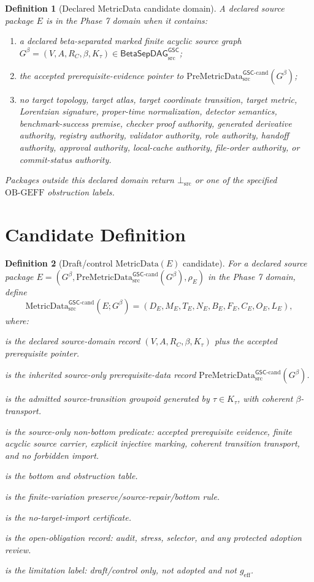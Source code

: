 \documentclass[11pt]{article}
\newcommand{\PreMetricData}{\mathrm{PreMetricData}_{\mathrm{src}}^{\mathsf{GSC}\mbox{-}\mathrm{cand}}}
\newcommand{\MetricData}{\mathrm{MetricData}_{\mathrm{src}}^{\mathsf{GSC}\mbox{-}\mathrm{cand}}}
\newcommand{\BottomSrc}{\bot_{\mathrm{src}}}
\newcommand{\BetaGraph}{\mathsf{BetaSepDAG}_{\mathrm{src}}^{\mathsf{GSC}}}
\newcommand{\Gbeta}{G^\beta}
\newcommand{\geff}{g_{\mathrm{eff}}}
\newcommand{\OBGEFF}{\mathrm{OB\mbox{-}GEFF}}
\newtheorem{definition}{Definition}
\begin{document}
\begin{definition}[Declared MetricData candidate domain]
A declared source package \(E\) is in the Phase 7 domain when it contains:
\begin{enumerate}[leftmargin=*]
  \item a declared beta-separated marked finite acyclic source graph
  \(\Gbeta=(V,A,R_C,\beta,K_\tau)\in\BetaGraph\);
  \item the accepted prerequisite-evidence pointer to
  \(\PreMetricData(\Gbeta)\);
  \item no target topology, target atlas, target coordinate transition, target
  metric, Lorentzian signature, proper-time normalization, detector semantics,
  benchmark-success premise, checker proof authority, generated derivative
  authority, registry authority, validator authority, role authority, handoff
  authority, approval authority, local-cache authority, file-order authority,
  or commit-status authority.
\end{enumerate}
Packages outside this declared domain return \(\BottomSrc\) or one of the
specified \(\OBGEFF\) obstruction labels.
\end{definition}

\section{Candidate Definition}

\begin{definition}[Draft/control \(\mathrm{MetricData}(E)\) candidate]
For a declared source package \(E=(\Gbeta,\PreMetricData(\Gbeta),\rho_E)\) in
the Phase 7 domain, define
\[
  \MetricData(E;\Gbeta)=
  (D_E,M_E,T_E,N_E,B_E,F_E,C_E,O_E,L_E),
\]
where:
\begin{description}[leftmargin=*]
  \item[\(D_E\)] is the declared source-domain record
  \((V,A,R_C,\beta,K_\tau)\) plus the accepted prerequisite pointer.
  \item[\(M_E\)] is the inherited source-only prerequisite-data record
  \(\PreMetricData(\Gbeta)\).
  \item[\(T_E\)] is the admitted source-transition groupoid generated by
  \(\tau\in K_\tau\), with coherent \(\beta\)-transport.
  \item[\(N_E\)] is the source-only non-bottom predicate:
  accepted prerequisite evidence, finite acyclic source carrier, explicit
  injective marking, coherent transition transport, and no forbidden import.
  \item[\(B_E\)] is the bottom and obstruction table.
  \item[\(F_E\)] is the finite-variation preserve/source-repair/bottom rule.
  \item[\(C_E\)] is the no-target-import certificate.
  \item[\(O_E\)] is the open-obligation record: audit, stress, selector, and
  any protected adoption review.
  \item[\(L_E\)] is the limitation label: draft/control only, not adopted and
  not \(\geff\).
\end{description}
\end{definition}
\end{document}
